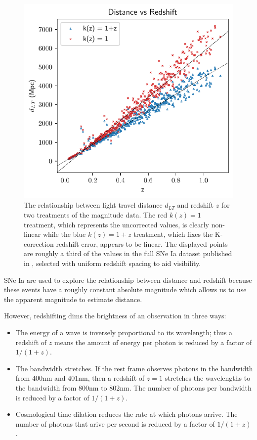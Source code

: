 \begin{figure}
  \includegraphics[width=\columnwidth]{distance_vs_redshift.pdf}
  \caption {The relationship between light travel distance $d_{LT}$ and
  redshift $z$ for two treatments of the magnitude data. The red ${k(z) = 1}$
  treatment, which represents the uncorrected values, is clearly non-linear
  while the blue ${k(z) = 1 + z}$ treatment, which fixes the K-correction
  redshift error, appears to be linear.  The displayed points are roughly a
  third of the values in the full SNe Ia dataset published in
  \citet{abbott2024}, selected with uniform redshift spacing to aid visibility.
  }
  \label{fig:distance_vs_redshift}
\end{figure}

SNe Ia are used to explore the relationship between distance and redshift because
these events have a roughly constant absolute magnitude which allows us to use
the apparent magnitude to estimate distance.

However, redshifting dims the brightness of an observation in three ways:

\begin{itemize}
  \item The energy of a wave is inversely proportional to its wavelength; thus a
  redshift of $z$ means the amount of energy per photon is reduced by a factor
  of ${1 / (1+z)}$.

  \item The bandwidth stretches. If the rest frame observes photons in the
  bandwidth from 400nm and 401nm, then a redshift of ${z = 1}$ stretches the
  wavelengths to the bandwidth from 800nm to 802nm. The number of photons per
  bandwidth is reduced by a factor of ${1 / (1+z)}$.

  \item Cosmological time dilation reduces the rate at which photons arrive.
  The number of photons that arive per second is reduced by a factor of ${1 / (1+z)}$.
\end{itemize}

